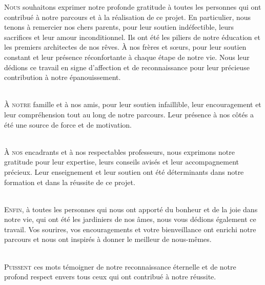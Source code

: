 \documentclass[a4paper, 11pt, openany]{report}
\begin{document}
\Newpage



\lettrine[nindent=0em, slope=-.5em]{\color{Eblue}N}{ous} souhaitons exprimer notre profonde gratitude à toutes les personnes qui ont contribué à notre parcours et à la réalisation de ce projet. En particulier, nous tenons à remercier nos chers parents, pour leur soutien indéfectible, leurs sacrifices et leur amour inconditionnel. Ils ont été les piliers de notre éducation et les premiers architectes de nos rêves. À nos frères et sœurs, pour leur soutien constant et leur présence réconfortante à chaque étape de notre vie. Nous leur dédions ce travail en signe d'affection et de reconnaissance pour leur précieuse contribution à notre épanouissement.

\ \\
\lettrine[nindent=0em, slope=-.5em]{\color{Eblue}À}{ notre} famille et à nos amis, pour leur soutien infaillible, leur encouragement et leur compréhension tout au long de notre parcours. Leur présence à nos côtés a été une source de force et de motivation.

\ \\
\lettrine[nindent=0em, slope=-.5em]{\color{Eblue}À}{ nos} encadrants et à nos respectables professeurs, nous exprimons notre gratitude pour leur expertise, leurs conseils avisés et leur accompagnement précieux. Leur enseignement et leur soutien ont été déterminants dans notre formation et dans la réussite de ce projet.

\ \\
\lettrine[nindent=0em, slope=-.5em]{\color{Eblue}E}{nfin}, à toutes les personnes qui nous ont apporté du bonheur et de la joie dans notre vie, qui ont été les jardiniers de nos âmes, nous vous dédions également ce travail. Vos sourires, vos encouragements et votre bienveillance ont enrichi notre parcours et nous ont inspirés à donner le meilleur de nous-mêmes.

\ \\
\lettrine[nindent=0em, slope=-.5em]{\color{Eblue}P}{uissent} ces mots témoigner de notre reconnaissance éternelle et de notre profond respect envers tous ceux qui ont contribué à notre réussite.
\end{document}
